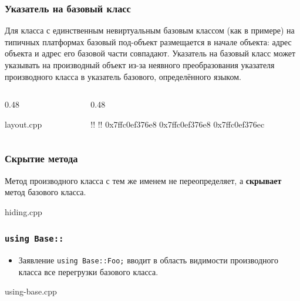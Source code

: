 \documentclass[compress, 8pt, aspectratio=169]{beamer}
\begin{document}
  \begin{frame}[fragile]

    \frametitle{Указатель на базовый класс}

    Для класса с единственным невиртуальным базовым классом (как в
    примере) на типичных платформах базовый под-объект размещается в
    начале объекта: адрес объекта и адрес его базовой части совпадают.
    Указатель на базовый класс может указывать на производный объект
    из-за неявного преобразования указателя производного класса в
    указатель базового, определённого языком.

    \begin{columns}[T]

      \begin{column}{0.48\textwidth}

            {layout.cpp}

      \end{column}

      \begin{column}{0.48\textwidth}

        \begin{terminalwindow}
!!
!!
0x7ffc0ef376e8
0x7ffc0ef376e8
0x7ffc0ef376ec
        \end{terminalwindow}

      \end{column}

    \end{columns}

  \end{frame}

  \begin{frame}[fragile]

    \frametitle{Скрытие метода}

    Метод производного класса с тем же именем не переопределяет,
    а \textbf{скрывает} метод базового класса.

        {hiding.cpp}

  \end{frame}

  \begin{frame}[fragile]

    \frametitle{\texttt{using Base::}}

    \begin{itemize}
      \item Заявление \texttt{using Base::Foo;} вводит в область видимости
        производного класса все перегрузки базового класса.
    \end{itemize}

        {using-base.cpp}

  \end{frame}
\end{document}
